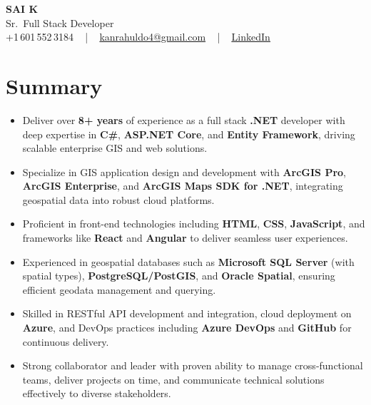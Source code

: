\documentclass[letterpaper,11pt]{article}
\newcommand{\resumeItem}[1]{
  \item\footnotesize{
    {#1 \vspace{-2pt}}
  }
}
\newcommand{\resumeItemListStart}{\begin{itemize}[leftmargin=*]}
\newcommand{\resumeItemListEnd}{\end{itemize}\vspace{-5pt}}
\begin{document}
\begin{center}
    {\fontsize{14pt}{12pt}\selectfont \textbf{\MakeUppercase{Sai K}}}\\ \vspace{2pt}
    \fontsize{10pt}{12pt}\selectfont Sr.\ Full Stack Developer\\ \vspace{2pt}
    \fontsize{10pt}{12pt}\selectfont +1\,601\,552\,3184 ~ | ~
    \href{mailto:kanrahuldo4@gmail.com}{kanrahuldo4@gmail.com} ~ | ~
    \href{https://www.linkedin.com/in/srrrk/}{\color{blue}\underline{LinkedIn}}
    \vspace{-10pt}
\end{center}

\section{Summary}
\fontsize{9pt}{10pt}\selectfont
\resumeItemListStart
  \resumeItem{Deliver over \textbf{8+ years} of experience as a full stack \textbf{.NET} developer with deep expertise in \textbf{C\#}, \textbf{ASP.NET Core}, and \textbf{Entity Framework}, driving scalable enterprise GIS and web solutions.}
  \resumeItem{Specialize in GIS application design and development with \textbf{ArcGIS Pro}, \textbf{ArcGIS Enterprise}, and \textbf{ArcGIS Maps SDK for .NET}, integrating geospatial data into robust cloud platforms.}
  \resumeItem{Proficient in front-end technologies including \textbf{HTML}, \textbf{CSS}, \textbf{JavaScript}, and frameworks like \textbf{React} and \textbf{Angular} to deliver seamless user experiences.}
  \resumeItem{Experienced in geospatial databases such as \textbf{Microsoft SQL Server} (with spatial types), \textbf{PostgreSQL/PostGIS}, and \textbf{Oracle Spatial}, ensuring efficient geodata management and querying.}
  \resumeItem{Skilled in RESTful API development and integration, cloud deployment on \textbf{Azure}, and DevOps practices including \textbf{Azure DevOps} and \textbf{GitHub} for continuous delivery.}
  \resumeItem{Strong collaborator and leader with proven ability to manage cross-functional teams, deliver projects on time, and communicate technical solutions effectively to diverse stakeholders.}
\resumeItemListEnd
\vspace{-6pt}

\end{document}
